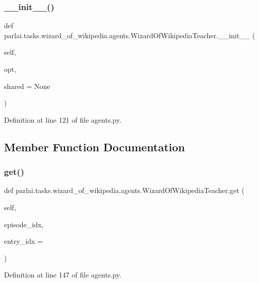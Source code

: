 \subsubsection{\texorpdfstring{\+\_\+\+\_\+init\+\_\+\+\_\+()}{\_\_init\_\_()}}
{\footnotesize\ttfamily def parlai.\+tasks.\+wizard\+\_\+of\+\_\+wikipedia.\+agents.\+Wizard\+Of\+Wikipedia\+Teacher.\+\_\+\+\_\+init\+\_\+\+\_\+ (\begin{DoxyParamCaption}\item[{}]{self,  }\item[{}]{opt,  }\item[{}]{shared = {\ttfamily None} }\end{DoxyParamCaption})}



Definition at line 121 of file agents.\+py.



\subsection{Member Function Documentation}
\mbox{\label{classparlai_1_1tasks_1_1wizard__of__wikipedia_1_1agents_1_1WizardOfWikipediaTeacher_acf1161101f1d7d03017da25f976488d6}} 
\subsubsection{\texorpdfstring{get()}{get()}}
{\footnotesize\ttfamily def parlai.\+tasks.\+wizard\+\_\+of\+\_\+wikipedia.\+agents.\+Wizard\+Of\+Wikipedia\+Teacher.\+get (\begin{DoxyParamCaption}\item[{}]{self,  }\item[{}]{episode\+\_\+idx,  }\item[{}]{entry\+\_\+idx = {} }\end{DoxyParamCaption})}



Definition at line 147 of file agents.\+py.




